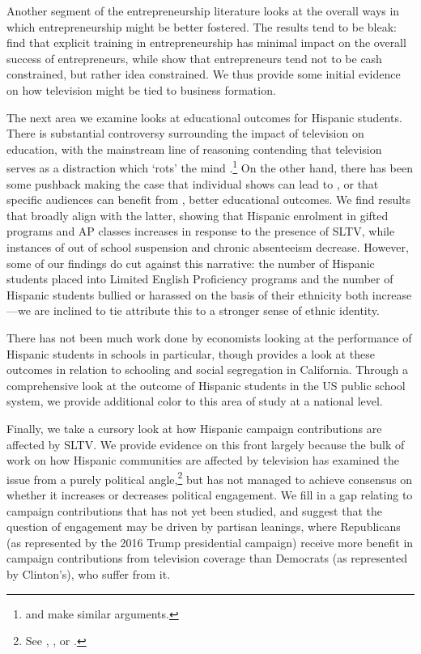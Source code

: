\documentclass[11pt]{article}
\begin{document}
Another segment of the entrepreneurship literature looks at the overall ways in which entrepreneurship might be better fostered. The results tend to be bleak: \cite{karlan_teaching_2011} find that explicit training in entrepreneurship has minimal impact on the overall success of entrepreneurs, while \cite{gine_money_2014} show that entrepreneurs tend not to be cash constrained, but rather idea constrained. We thus provide some initial evidence on how television might be tied to business formation. 


The next area we examine looks at educational outcomes for Hispanic students. There is substantial controversy surrounding the impact of television on education, with the mainstream line of reasoning contending that television serves as a distraction which `rots' the mind \citep{zavodny_does_2006}.\footnote{ \cite{winn_plug-drug_2002} and \cite{gentile_well-child_2004} make similar arguments.} On the other hand, there has been some pushback making the case that individual shows can lead to \citep{kearney_media_2015}, or that specific audiences can benefit from \citep{gentzkow_preschool_2008}, better educational outcomes. We find results that broadly align with the latter, showing that Hispanic enrolment in gifted programs and AP classes increases in response to the presence of SLTV, while instances of out of school suspension and chronic absenteeism decrease. However, some of our findings do cut against this narrative: the number of Hispanic students placed into Limited English Proficiency programs and the number of Hispanic students bullied or harassed on the basis of their ethnicity both increase---we are inclined to tie attribute this to a stronger sense of ethnic identity.

There has not been much work done by economists looking at the performance of Hispanic students in schools in particular, though \cite{cascio_cracks_2012} provides a look at these outcomes in relation to schooling and social segregation in California. Through a comprehensive look at the outcome of Hispanic students in the US public school system, we provide additional color to this area of study at a national level.

Finally, we take a cursory look at how Hispanic campaign contributions are affected by SLTV. We provide evidence on this front largely because the bulk of work on how Hispanic communities are affected by television has examined the issue from a purely political angle,\footnote{ See \cite{oberholzer-gee_media_2009}, \cite{velez_tuning_2019}, or \cite{trujillo_devil_2012}.} but has not managed to achieve consensus on whether it increases or decreases political engagement. We fill in a gap relating to campaign contributions that has not yet been studied, and suggest that the question of engagement may be driven by partisan leanings, where Republicans (as represented by the 2016 Trump presidential campaign) receive more benefit in campaign contributions from television coverage than Democrats (as represented by Clinton's), who suffer from it. 
\end{document}
